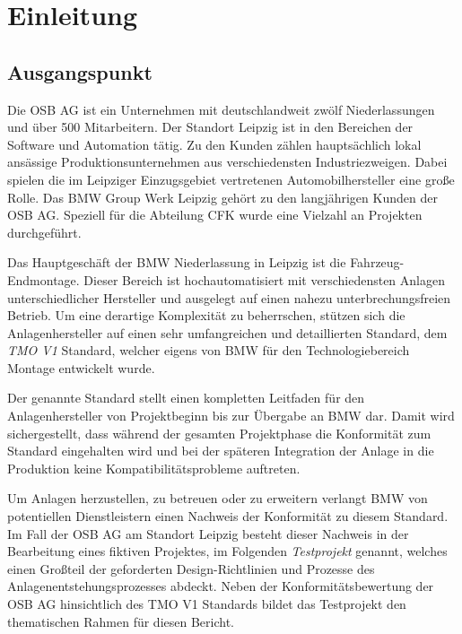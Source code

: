 


\chapter{Einleitung}
\label{chap:intro}

\section{Ausgangspunkt}

Die OSB AG ist ein Unternehmen mit deutschlandweit zwölf Niederlassungen und über 500 Mitarbeitern. Der Standort Leipzig ist in den Bereichen der Software und Automation tätig. Zu den Kunden zählen hauptsächlich lokal ansässige Produktionsunternehmen aus verschiedensten Industriezweigen. Dabei spielen die im Leipziger Einzugsgebiet vertretenen Automobilhersteller eine große Rolle.
Das BMW Group Werk Leipzig gehört zu den langjährigen Kunden der OSB AG. Speziell für die Abteilung CFK wurde eine Vielzahl an Projekten durchgeführt.

Das Hauptgeschäft der BMW Niederlassung in Leipzig ist die Fahrzeug-Endmontage. Dieser Bereich ist hochautomatisiert mit verschiedensten Anlagen unterschiedlicher Hersteller und ausgelegt auf einen nahezu unterbrechungsfreien Betrieb. Um eine derartige Komplexität zu beherrschen, stützen sich die Anlagenhersteller auf einen sehr umfangreichen und detaillierten Standard, dem \emph{TMO V1} Standard, welcher eigens von BMW für den Technologiebereich Montage entwickelt wurde.

Der genannte Standard stellt einen kompletten Leitfaden für den Anlagenhersteller von Projektbeginn bis zur Übergabe an BMW dar. Damit wird sichergestellt, dass während der gesamten Projektphase die Konformität zum Standard eingehalten wird und bei der späteren Integration der Anlage in die Produktion keine Kompatibilitätsprobleme auftreten.

Um Anlagen herzustellen, zu betreuen oder zu erweitern verlangt BMW von potentiellen Dienstleistern einen Nachweis der Konformität zu diesem Standard. Im Fall der OSB AG am Standort Leipzig besteht dieser Nachweis in der Bearbeitung eines fiktiven Projektes, im Folgenden \emph{Testprojekt} genannt, welches einen Großteil der geforderten Design-Richtlinien und Prozesse des Anlagenentstehungsprozesses abdeckt. Neben der Konformitätsbewertung der OSB AG hinsichtlich des TMO V1 Standards bildet das Testprojekt den thematischen Rahmen für diesen Bericht.


